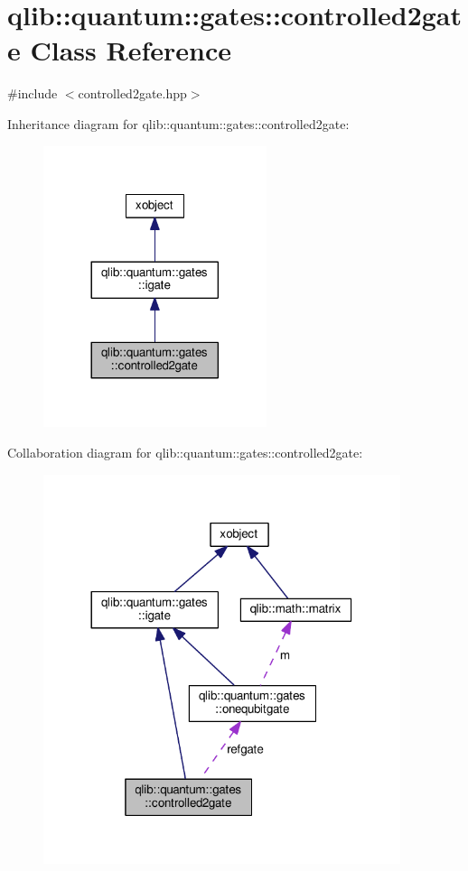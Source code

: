 \hypertarget{classqlib_1_1quantum_1_1gates_1_1controlled2gate}{}\section{qlib\+:\+:quantum\+:\+:gates\+:\+:controlled2gate Class Reference}
\label{classqlib_1_1quantum_1_1gates_1_1controlled2gate}


{\ttfamily \#include $<$controlled2gate.\+hpp$>$}



Inheritance diagram for qlib\+:\+:quantum\+:\+:gates\+:\+:controlled2gate\+:\nopagebreak
\begin{figure}[H]
\begin{center}
\leavevmode
\includegraphics[width=185pt]{classqlib_1_1quantum_1_1gates_1_1controlled2gate__inherit__graph}
\end{center}
\end{figure}


Collaboration diagram for qlib\+:\+:quantum\+:\+:gates\+:\+:controlled2gate\+:\nopagebreak
\begin{figure}[H]
\begin{center}
\leavevmode
\includegraphics[width=296pt]{classqlib_1_1quantum_1_1gates_1_1controlled2gate__coll__graph}
\end{center}
\end{figure}
